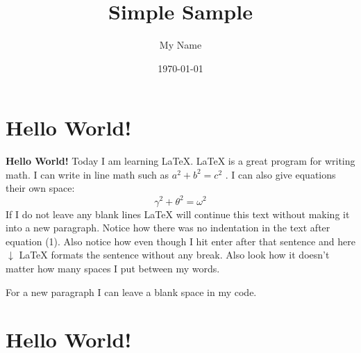 \documentclass{article} %
\title{Simple Sample} %
\author{My Name} %
\date{\today} %
\begin{document}
    \maketitle %
    
    \section{Hello World!} %
    
    \textbf{Hello World!} Today I am learning \LaTeX. %
     \LaTeX{} is a great program for writing math. I can write in line math such as $a^2+b^2=c^2$ %
     . I can also give equations their own space: 
    \begin{equation} %
    \gamma^2+\theta^2=\omega^2
    \end{equation}
    If I do not leave any blank lines \LaTeX{} will continue  this text without making it into a new paragraph.  Notice how there was no indentation in the text after equation (1).  
    Also notice how even though I hit enter after that sentence and here $\downarrow$
     \LaTeX{} formats the sentence without any break.  Also   look  how      it   doesn't     matter          how    many  spaces     I put     between       my    words.
    
    For a new paragraph I can leave a blank space in my code. 

    \pagebreak

    \section{Hello World!}
\end{document}
